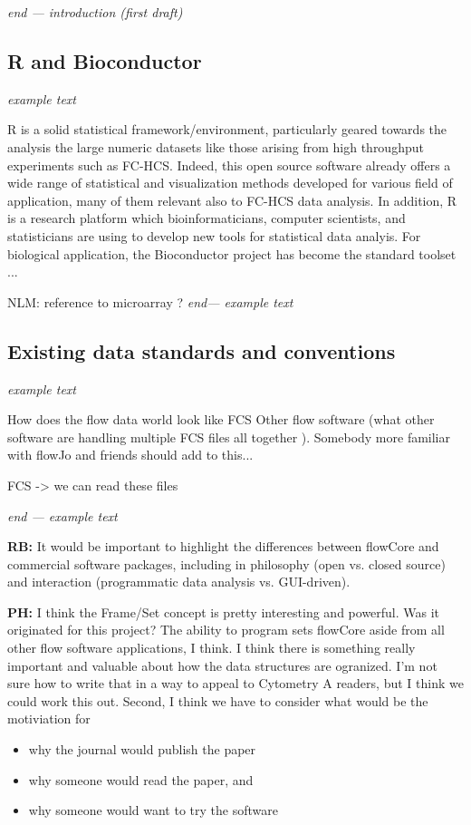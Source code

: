 \documentclass[12pt]{article}
\begin{document}
\textit{end --- introduction (first draft)}

\subsection{R and Bioconductor}

\textit{ example text}

R is a solid statistical framework/environment, particularly geared
towards the analysis the large numeric datasets like those arising
from high throughput experiments such as FC-HCS. Indeed, this open
source software already offers a wide range of statistical and
visualization methods developed for various field of application, many
of them relevant also to FC-HCS data analysis. 
In addition, R is a research platform which
bioinformaticians, computer scientists, and statisticians are using to
develop new tools for statistical data analyis. For biological
application, the Bioconductor project has become the standard toolset
\citep{gentleman2006bos}...  

NLM: reference to microarray ?
\textit{end--- example text}

\subsection{Existing data standards and conventions}

\textit{ example text}

How does the flow data world look like FCS Other flow software (what
other software are handling multiple FCS files all together
). Somebody more familiar with flowJo and friends should add to
this...

FCS -> we can read these files

\textit{end --- example text}

{\bf RB:}  It would be important to highlight
the differences between flowCore and commercial software packages,
including in philosophy (open vs. closed source) and interaction
(programmatic data analysis vs. GUI-driven). 

{\bf PH:} I think the Frame/Set concept is pretty interesting and
powerful. Was it originated for this project? The ability to program
sets flowCore aside from all other flow software applications, I
think. I think there is something really important and valuable about
how the data structures are ogranized. I'm not sure how to write that
in a way to appeal to Cytometry A readers, but I think we could work
this out. Second, I think we have to consider what would be the
motiviation for 
\begin{itemize}
\item why the journal would publish the paper 
\item why someone would read the paper, and
\item why someone would want to try the software
\end{itemize}
\end{document}
